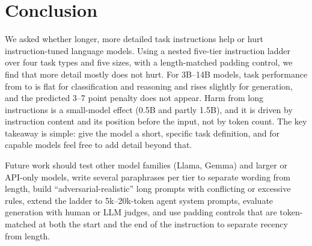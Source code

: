 \section{Conclusion}
\label{sec:conclusion}

We asked whether longer, more detailed task instructions help or hurt instruction-tuned language models.
Using a nested five-tier instruction ladder over four task types and five \qwen sizes, with a length-matched padding control, we find that more detail mostly does not hurt.
For 3B--14B models, task performance from \standard to \exhaustive is flat for classification and reasoning and rises slightly for generation, and the predicted 3--7 point penalty does not appear.
Harm from long instructions is a small-model effect (0.5B and partly 1.5B), and it is driven by instruction content and its position before the input, not by token count.
The key takeaway is simple: give the model a short, specific task definition, and for capable models feel free to add detail beyond that.

Future work should test other model families (Llama, Gemma) and larger or API-only models, write several paraphrases per tier to separate wording from length, build ``adversarial-realistic'' long prompts with conflicting or excessive rules, extend the ladder to 5k--20k-token agent system prompts, evaluate generation with human or LLM judges, and use padding controls that are token-matched at both the start and the end of the instruction to separate recency from length.
